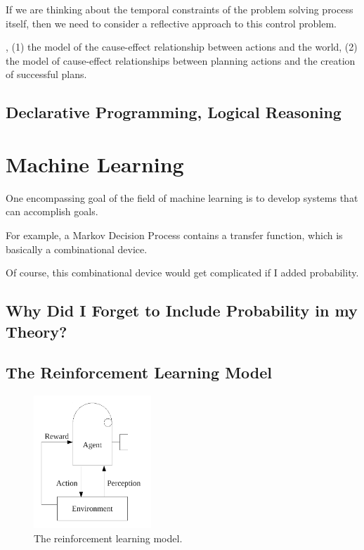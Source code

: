 If we are thinking about the temporal constraints of the problem
solving process itself, then we need to consider a reflective approach
to this control problem.

  , (1) the model of the cause-effect relationship
between actions and the world, (2) the model of cause-effect
relationships between planning actions and the creation of successful
plans.

\subsection{Declarative Programming, Logical Reasoning}


\section{Machine Learning}

One encompassing goal of the field of machine learning is to develop
systems that can accomplish goals.

For example, a Markov Decision Process contains a transfer function,
which is basically a combinational device.

Of course, this combinational device would get complicated if I added probability.



\subsection{Why Did I Forget to Include Probability in my Theory?}



\subsection{The Reinforcement Learning Model}

\begin{figure}[bth]
  \center
  \includegraphics[height=5cm]{gfx/reinforcement_learning}
  \caption[The reinforcement learning model]{The reinforcement learning model.}
  \label{fig:reinforcement_learning}
\end{figure}

